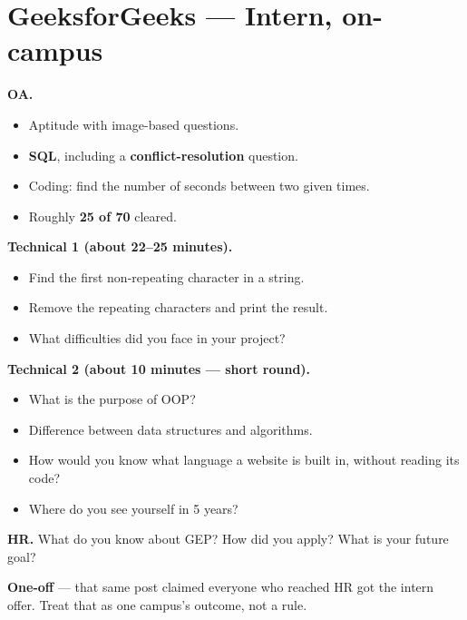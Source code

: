 \documentclass[11pt,a4paper]{article}
\newcommand{\tg}[1]{\textcolor{tag}{\textbf{\footnotesize #1}}}
\newcommand{\rnd}[1]{\textcolor{accent}{\textbf{#1}}}
\newcommand{\q}[1]{\textcolor{qcol}{#1}}
\newcommand{\card}[1]{%
  \par\vspace{5pt}%
  \noindent\colorbox{soft}{%
    \parbox{\dimexpr\textwidth-2\fboxsep}{\vspace{6pt}#1\vspace{6pt}}%
  }\par\vspace{7pt}%
}
\begin{document}
\section{GeeksforGeeks --- Intern, on-campus}
\card{
\rnd{OA.}
\begin{itemize}
  \item Aptitude with image-based questions.
  \item \textbf{SQL}, including a \textbf{conflict-resolution} question.
  \item Coding: \q{find the number of seconds between two given times.}
  \item Roughly \textbf{25 of 70} cleared.
\end{itemize}
\vspace{3pt}
\rnd{Technical 1 (about 22--25 minutes).}
\begin{itemize}
  \item \q{Find the first non-repeating character in a string.}
  \item \q{Remove the repeating characters and print the result.}
  \item \q{What difficulties did you face in your project?}
\end{itemize}
\vspace{3pt}
\rnd{Technical 2 (about 10 minutes --- short round).}
\begin{itemize}
  \item \q{What is the purpose of OOP?}
  \item \q{Difference between data structures and algorithms.}
  \item \q{How would you know what language a website is built in, without reading its code?}
  \item \q{Where do you see yourself in 5 years?}
\end{itemize}
\vspace{3pt}
\rnd{HR.} \q{What do you know about GEP?} \quad \q{How did you apply?} \quad \q{What is your future goal?}
}
\tg{One-off} --- that same post claimed everyone who reached HR got the intern offer. Treat that as one campus's outcome, not a rule.
\end{document}
